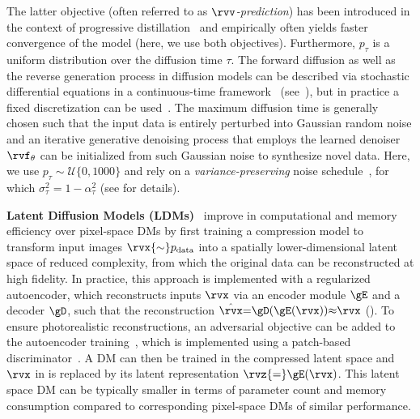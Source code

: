 The latter objective (often referred to as \emph{$\rvv$-prediction}) has been introduced in the context of progressive distillation~\cite{salimans2022progressive} and empirically often yields faster convergence of the model (here, we use both objectives). Furthermore,
$p_\tau$ is a uniform distribution over the diffusion time $\tau$. The forward diffusion as well as the reverse generation process in diffusion models can be described via stochastic differential equations in a continuous-time framework~\cite{song2020score} (see~), but in practice a fixed discretization can be used~\cite{ho2020ddpm}.
The maximum diffusion time is generally chosen such that the input data is entirely perturbed into Gaussian random noise and an iterative generative denoising process that employs the learned denoiser $\rvf_\theta$ can be initialized from such Gaussian noise to synthesize novel data.
Here, we use $p_\tau\sim\mathcal{U}\{0,1000\}$ and rely on a \emph{variance-preserving} noise schedule~\cite{song2020score}, for which $\sigma_\tau^2 = 1 - \alpha_\tau^2$ (see  for details). 

\textbf{Latent Diffusion Models (LDMs)}~\cite{rombach2021highresolution} improve in computational and memory efficiency over pixel-space DMs by first training a compression model to transform input images $\rvx{\sim}p_{\text{data}}$ into a spatially lower-dimensional latent space of reduced complexity, from which the original data can be reconstructed at high fidelity.
In practice, this approach is implemented with a regularized autoencoder, which reconstructs inputs $\rvx$ via an encoder module $\gE$ and a decoder $\gD$, such that the reconstruction $\hat{\rvx}{=}\gD(\gE(\rvx)){\approx}\rvx$ (). To ensure photorealistic reconstructions, an adversarial objective can be added to the autoencoder training~\cite{rombach2021highresolution}, which is implemented using a patch-based discriminator~\cite{isola2017image}. 
A DM can then be trained in the compressed latent space and $\rvx$ in  is replaced by its latent representation $\rvz{=}\gE(\rvx)$. This latent space DM can be typically smaller in terms of parameter count and memory consumption compared to corresponding pixel-space DMs of similar performance.

\vspace{-1.5mm}
